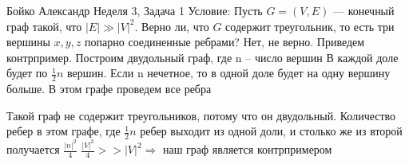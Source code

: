 \documentclass[a4paper,12pt]{article}
\numberwithin{equation}{section}
\theoremstyle{plain}
\theoremstyle{definition}
\theoremstyle{remark}
\begin{document}

Бойко Александр
\newline
\newline
Неделя 3, Задача 1 \newline
Условие: Пусть $G=(V,E)$ --- конечный граф такой, что $|E| \gg |V|^2$. Верно ли, что $G$ содержит треугольник, то есть три вершины $x,y,z$ попарно соединенные ребрами? \newline
Нет, не верно. Приведем контрпример. \newline
Построим двудольный граф, где n -- число вершин \newline
В каждой доле будет по $\frac{1}{2}n$ вершин. Если n нечетное, то в одной доле будет на одну вершину больше. В этом графе проведем все ребра



Такой граф не содержит треугольников, потому что он двудольный. Количество ребер в этом графе, где $\frac{1}{2}n$ ребер выходит из одной доли, и столько же из второй получается $\frac{|n|^2}{4}$ \newline
$\frac{|V|^2}{4} >> |V|^2 \Rightarrow$ наш граф является контрпримером
\end{document}
